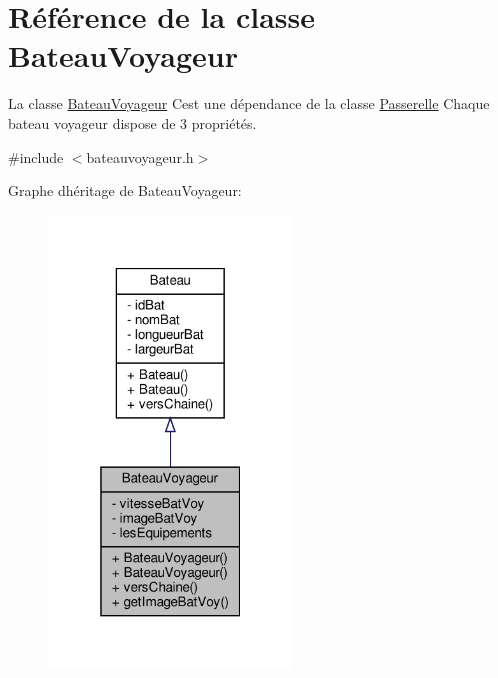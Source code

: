 \hypertarget{class_bateau_voyageur}{}\section{Référence de la classe Bateau\+Voyageur}
\label{class_bateau_voyageur}


La classe \hyperlink{class_bateau_voyageur}{Bateau\+Voyageur} C\textquotesingle{}est une dépendance de la classe \hyperlink{class_passerelle}{Passerelle} Chaque bateau voyageur dispose de 3 propriétés.  




{\ttfamily \#include $<$bateauvoyageur.\+h$>$}



Graphe d\textquotesingle{}héritage de Bateau\+Voyageur\+:\nopagebreak
\begin{figure}[H]
\begin{center}
\leavevmode
\includegraphics[width=184pt]{class_bateau_voyageur__inherit__graph}
\end{center}
\end{figure}


